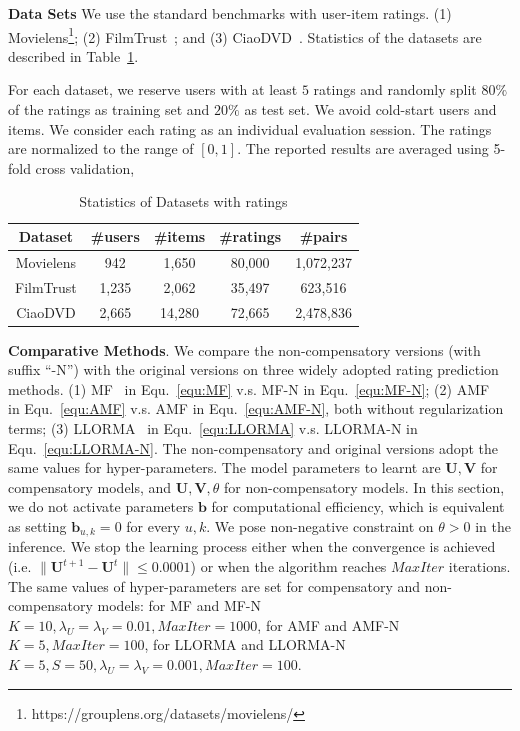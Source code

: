 \documentclass[letterpaper]{article} %
\begin{document}
\textbf{Data Sets} We use the standard benchmarks with user-item ratings. (1) Movielens\footnote{https://grouplens.org/datasets/movielens/}; (2) FilmTrust~\cite{Guo2013Novel}; and (3) CiaoDVD~\cite{Guo2014ETAF}. Statistics of the datasets are described in Table~\ref{tab:datasets}. 

For each dataset, we reserve users with at least $5$ ratings and randomly split $80\%$ of the ratings as training set and $20\%$ as test set. We avoid cold-start users and items. We consider each rating as an individual evaluation session. The ratings are normalized to the range of $[0,1]$. The reported results are averaged using 5-fold cross validation, 
\begin{table}[htp]
\caption{Statistics of Datasets with ratings}
\scriptsize
\begin{center}
\begin{tabular}{|c|c|c|c|c|}
\hline
Dataset & \#users & \#items & \#ratings & \#pairs \\\hline
Movielens &942 &1,650 &80,000 & 1,072,237 \\\hline
FilmTrust &1,235 &2,062 &35,497 &623,516 \\\hline
CiaoDVD &2,665 &14,280 &72,665 &2,478,836 \\\hline
\end{tabular}
\end{center}
\label{tab:datasets}
\end{table}
\textbf{Comparative Methods}. We compare the non-compensatory versions (with suffix ``-N'') with the original versions on three widely adopted rating prediction methods. (1) MF~\cite{Koren2009Matrix} in Equ.~\ref{equ:MF} v.s. MF-N in Equ.~\ref{equ:MF-N};  (2) AMF~\cite{Koren2008Factorization} in Equ.~\ref{equ:AMF} v.s. AMF in Equ.~\ref{equ:AMF-N}, both without regularization terms; (3) LLORMA~\cite{Lee2013Local} in Equ.~\ref{equ:LLORMA} v.s. LLORMA-N in Equ.~\ref{equ:LLORMA-N}. The non-compensatory and original versions adopt the same values for hyper-parameters. The model parameters to learnt are $\mathbf{U},\mathbf{V}$ for compensatory models, and  $\mathbf{U},\mathbf{V},\theta$ for non-compensatory models. In this section, we do not activate parameters $\mathbf{b}$ for computational efficiency, which is equivalent as setting $\mathbf{b}_{u,k}=0$ for every $u,k$. We pose non-negative constraint on $\theta>0$ in the inference. We stop the learning process either when the convergence is achieved (i.e. $\|\mathbf{U}^{t+1}-\mathbf{U}^t\|\leq 0.0001$) or when the algorithm reaches $MaxIter$ iterations. The same values of hyper-parameters are set for compensatory and non-compensatory models: for MF and MF-N $K=10, \lambda_U=\lambda_V=0.01,MaxIter=1000$, for AMF and AMF-N $K=5,MaxIter=100$, for LLORMA and LLORMA-N $K=5,S=50,\lambda_U=\lambda_V=0.001,MaxIter=100$.
\end{document}
